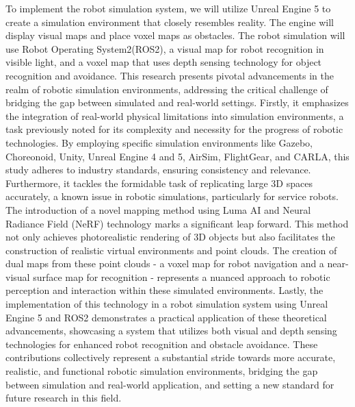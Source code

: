To implement the robot simulation system, we will utilize Unreal Engine 5 to create a simulation environment that closely resembles reality. The engine will display visual maps and place voxel maps as obstacles. The robot simulation will use Robot Operating System2(ROS2)\cite{ros2}, a visual map for robot recognition in visible light, and a voxel map that uses depth sensing technology for object recognition and avoidance. 
\singlespacing
This research presents pivotal advancements in the realm of robotic simulation environments, addressing the critical challenge of bridging the gap between simulated and real-world settings. Firstly, it emphasizes the integration of real-world physical limitations into simulation environments, a task previously noted for its complexity and necessity for the progress of robotic technologies. By employing specific simulation environments like Gazebo, Choreonoid, Unity, Unreal Engine 4 and 5, AirSim, FlightGear, and CARLA, this study adheres to industry standards, ensuring consistency and relevance. Furthermore, it tackles the formidable task of replicating large 3D spaces accurately, a known issue in robotic simulations, particularly for service robots. The introduction of a novel mapping method using Luma AI and Neural Radiance Field (NeRF) technology marks a significant leap forward. This method not only achieves photorealistic rendering of 3D objects but also facilitates the construction of realistic virtual environments and point clouds. The creation of dual maps from these point clouds - a voxel map for robot navigation and a near-visual surface map for recognition - represents a nuanced approach to robotic perception and interaction within these simulated environments. Lastly, the implementation of this technology in a robot simulation system using Unreal Engine 5 and ROS2 demonstrates a practical application of these theoretical advancements, showcasing a system that utilizes both visual and depth sensing technologies for enhanced robot recognition and obstacle avoidance. These contributions collectively represent a substantial stride towards more accurate, realistic, and functional robotic simulation environments, bridging the gap between simulation and real-world application, and setting a new standard for future research in this field.